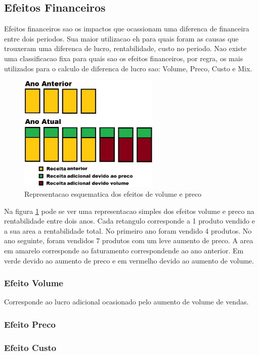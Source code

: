 \documentclass[12pt]{article}
\begin{document}
\subsection{Efeitos Financeiros}
Efeitos financeiros sao os impactos que ocassionam uma diferenca de financeira entre dois periodos. Sua maior utilizacao eh para quais foram as causas que trouxeram uma diferenca de lucro, rentabilidade, custo no periodo. Nao existe uma classificacao fixa para quais sao os efeitos financeiros, por regra, os mais utilizados para o calculo de diferenca de lucro sao: Volume, Preco, Custo e Mix.

\begin{figure}[h!]
	\centering
	\includegraphics[width=0.6\textwidth]{img/effects.png}
	\caption{Representacao esquematica dos efeitos de volume e preco}
	\label{fig:effects}
\end{figure}

Na figura \ref{fig:effects} pode se ver uma representacao simples dos efeitos volume e preco na rentabilidade entre dois anos. Cada retangulo corresponde a 1 produto vendido e a sua area a rentabilidade total. No primeiro ano foram vendido 4 produtos. No ano seguinte, foram vendidos 7 produtos com um leve aumento de preco. A area em amarelo corresponde ao faturamento correspondende ao ano anterior. Em verde devido ao aumento de preco e em vermelho devido ao aumento de volume.

\subsubsection{Efeito Volume}
Corresponde ao lucro adicional ocasionado pelo aumento de volume de vendas.

\subsubsection{Efeito Preco}
\subsubsection{Efeito Custo}
\end{document}
